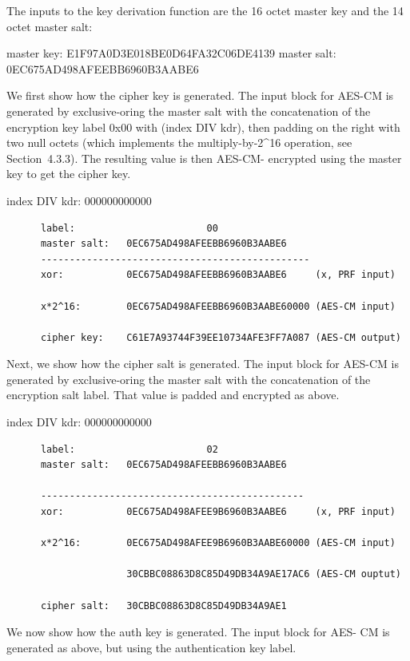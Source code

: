 \documentclass{article}
\begin{document}
The inputs to the key derivation function are the 16 octet master key and the 14 octet master salt:

master key:  E1F97A0D3E018BE0D64FA32C06DE4139 master salt: 0EC675AD498AFEEBB6960B3AABE6

We first show how the cipher key is generated.  The input block for AES-CM is generated by exclusive-oring the master salt with the concatenation of the encryption key label 0x00 with (index DIV kdr), then padding on the right with two null octets (which implements the multiply-by-2\textasciicircum{}16 operation, see Section~4.3.3).  The resulting value is then AES-CM- encrypted using the master key to get the cipher key.

index DIV kdr:                 000000000000

\begin{verbatim}
      label:                       00
      master salt:   0EC675AD498AFEEBB6960B3AABE6
      -----------------------------------------------
      xor:           0EC675AD498AFEEBB6960B3AABE6     (x, PRF input)

      x*2^16:        0EC675AD498AFEEBB6960B3AABE60000 (AES-CM input)

      cipher key:    C61E7A93744F39EE10734AFE3FF7A087 (AES-CM output)
\end{verbatim}

Next, we show how the cipher salt is generated.  The input block for AES-CM is generated by exclusive-oring the master salt with the concatenation of the encryption salt label.  That value is padded and encrypted as above.

index DIV kdr:                 000000000000

\begin{verbatim}
      label:                       02
      master salt:   0EC675AD498AFEEBB6960B3AABE6

      ----------------------------------------------
      xor:           0EC675AD498AFEE9B6960B3AABE6     (x, PRF input)

      x*2^16:        0EC675AD498AFEE9B6960B3AABE60000 (AES-CM input)

                     30CBBC08863D8C85D49DB34A9AE17AC6 (AES-CM ouptut)

      cipher salt:   30CBBC08863D8C85D49DB34A9AE1
\end{verbatim}

We now show how the auth key is generated.  The input block for AES- CM is generated as above, but using the authentication key label.
\end{document}
